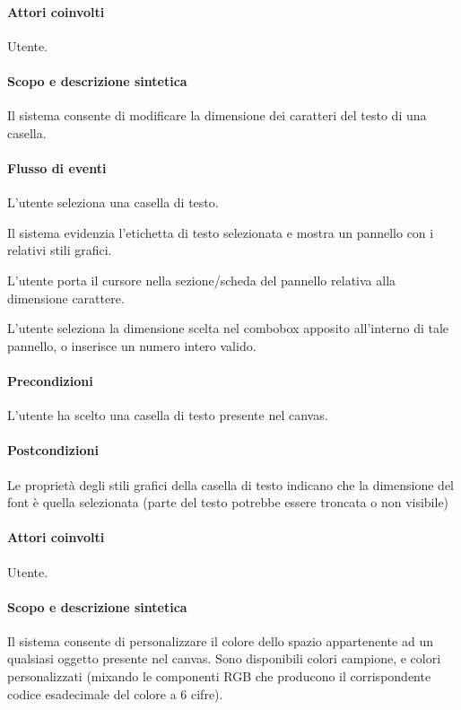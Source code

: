 \paragraph{Attori coinvolti} Utente.
\paragraph{Scopo e descrizione sintetica} 
Il sistema consente di modificare la dimensione dei caratteri del testo di una casella.
\paragraph{Flusso di eventi}
\begin{elenconumerato}[\textbf{}]{\subsubsecindent}
\item L'utente seleziona una casella di testo.
\item Il sistema evidenzia l'etichetta di testo selezionata e mostra un pannello con i relativi stili grafici.
\item L'utente porta il cursore nella sezione/scheda del pannello relativa alla dimensione carattere.
\item L'utente seleziona la dimensione scelta nel combobox apposito all'interno di tale pannello, o inserisce un numero intero valido.
\end{elenconumerato}
\paragraph{Precondizioni}L'utente ha scelto una casella di testo presente nel canvas.
\paragraph{Postcondizioni}Le proprietà degli stili grafici della casella di testo indicano che la dimensione del font \` e quella selezionata (parte del testo potrebbe essere troncata o non visibile)

\paragraph{Attori coinvolti} Utente.
\paragraph{Scopo e descrizione sintetica}   Il sistema consente di personalizzare il colore dello spazio appartenente ad un qualsiasi oggetto presente nel canvas. Sono disponibili colori campione, e colori personalizzati (mixando le componenti RGB che producono il corrispondente codice esadecimale del colore a 6 cifre).
